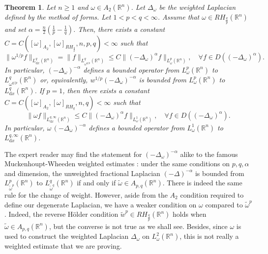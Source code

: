 \documentclass[12pt, letterpaper]{amsart}
\newtheorem{thm}{Theorem}[section]
\theoremstyle{definition}
\theoremstyle{remark}
\numberwithin{equation}{section}
\begin{document}
\begin{thm}\label{thm:principal}
    Let $n\ge 1$ and $\omega \in A_2(\mathbb{R}^n)$. Let $\Delta_\omega$ be the weighted Laplacian defined by the method of forms. Let $1<p<q<\infty$. Assume that $\omega \in RH_{\frac{q}{p}}(\mathbb{R}^n)$ and set $\alpha=\frac{n}{2}(\frac{1}{p}-\frac{1}{q})$. Then, there exists a constant $C = C([ \omega  ]_{A_2},[ \omega  ]_{RH_{\frac{q}{p}}},n,p,q)<\infty$ such that
    \begin{equation}\label{eq:fractionalHLS}
       \| \omega^{1/p}f \|_{L^q_{\mathrm{d}x}(\mathbb{R}^n)}= \| f \|_{L^q_{{\omega}^{q/p}}(\mathbb{R}^n)} \leq C \| (-\Delta_\omega)^\alpha f \|_{L^p_{\omega}(\mathbb{R}^n)}, \quad \forall f \in D((-\Delta_\omega)^\alpha).
    \end{equation}
    In particular, $(-\Delta_\omega)^{-\alpha}$ defines a bounded operator from $L^p_\omega(\mathbb{R}^n)$ to $L^q_{{\omega}^{q/p}}(\mathbb{R}^n)$ or, equivalently, $w^{1/p}(-\Delta_\omega)^{-\alpha}$ is bounded from $L^p_\omega(\mathbb{R}^n)$ to $L^q_{\mathrm{d}x}(\mathbb{R}^n)$. If $p=1$, then there exists a constant $C = C([ \omega  ]_{A_2},[ \omega  ]_{RH_{q}},n,q)<\infty$ such that
    \begin{equation}\label{eq:fractionalHLSweak}
        \| \omega  f \|_{L^{q,\infty}_{\mathrm{d}x}(\mathbb{R}^n)} \leq C \| (-\Delta_\omega)^\alpha f \|_{L^1_{\omega}(\mathbb{R}^n)}, \quad \forall f \in D((-\Delta_\omega)^\alpha).
    \end{equation}
    In particular, $\omega \,(-\Delta_\omega)^{-\alpha}$ defines a bounded operator from $L^1_\omega(\mathbb{R}^n)$ to $L^{q,\infty}_{\mathrm{d}x}(\mathbb{R}^n)$.
\end{thm}



The expert reader may find the statement for $(-\Delta_\omega)^{-\alpha}$ alike to the famous Muckenhoupt-Wheeden weighted estimates \cite{muckenhoupt1974weighted}: under the same conditions on $p,q,\alpha$ and dimension, the unweighted fractional Laplacian $(-\Delta)^{-\alpha}$ is bounded from  $L^p_{\tilde\omega^p}(\mathbb{R}^n)$ to $L^q_{\tilde\omega^q}(\mathbb{R}^n)$ if and only if $\tilde\omega \in A_{p,q}(\mathbb{R}^n)$. There is indeed the same rule for the change of  weight. However, aside from the $A_2$ condition required to define our degenerate Laplacian, we  have a weaker condition on $\omega$ compared to  $\tilde\omega^p$.   Indeed, the reverse H\"older condition  $\tilde w^p\in RH_{\frac{q}{p}}(\mathbb{R}^n)$ holds when $\tilde\omega \in A_{p,q}(\mathbb{R}^n)$, but the converse is not true as we shall see. Besides, since $\omega$ is used to construct  the weighted Laplacian $\Delta_\omega$ on $L^2_{\omega}(\mathbb{R}^n)$, this is not really a weighted estimate that we are proving.
\end{document}
